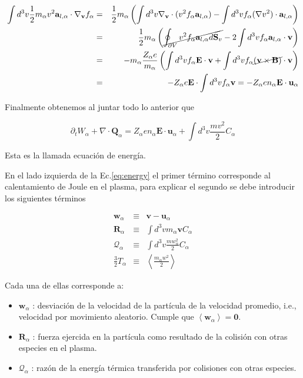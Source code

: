\begin{eqnarray}
  \int d^3v \frac{1}{2}m_\alpha v^2\textbf{a}_{l,\alpha}\cdot \nabla_\textbf{v}f_\alpha&=& \frac{1}{2}m_\alpha \left(\int d^3v \nabla_\textbf{v}\cdot(v^2f_\alpha\textbf{a}_{l,\alpha}) - \int d^3v f_\alpha (\nabla v^2) \cdot \textbf{a}_{l,\alpha}\right)\nonumber\\
  &=& \frac{1}{2}m_\alpha\left(\cancel{\oint_{\partial V}v^2f_\alpha \textbf{a}_{l,\alpha}d\textbf{S}_v} - 2\int d^3v f_\alpha \textbf{a}_{l,\alpha}\cdot\textbf{v}\right) \nonumber\\
  &=& -m_\alpha\frac{Z_\alpha e}{m_\alpha}\left(\int d^3v f_\alpha \textbf{E}\cdot\textbf{v} + \int d^3v f_\alpha \cancel{(\textbf{v}\times\textbf{B})}\cdot\textbf{v}\right)\nonumber\\
  &=& -Z_\alpha e\textbf{E}\cdot\int d^3v f_\alpha \textbf{v} = -Z_\alpha en_\alpha\textbf{E}\cdot\textbf{u}_\alpha 
\end{eqnarray}

Finalmente obtenemos al juntar todo lo anterior que 

\begin{equation}\label{eq:energy}
  \partial_t W_\alpha + \nabla\cdot\textbf{Q}_\alpha = Z_\alpha en_\alpha\textbf{E}\cdot\textbf{u}_\alpha + \int d^3v\frac{mv^2}{2}C_\alpha
\end{equation}

Esta es la llamada ecuaci\'on de energ\'ia.

En el lado izquierda de la Ec.\eqref{eq:energy} el primer t\'ermino corresponde al calentamiento de Joule en el plasma, para explicar el segundo se debe introducir los siguientes t\'erminos

  \begin{eqnarray}
    \textbf{w}_\alpha &\equiv& \textbf{v} - \textbf{u}_\alpha \nonumber\\
    \textbf{R}_\alpha &\equiv& \int d^3v m_\alpha\textbf{v}C_\alpha \nonumber\\
    \mathcal{Q}_\alpha &\equiv& \int d^3v \frac{mw_\alpha^2}{2}C_\alpha \nonumber\\
    \frac{3}{2}T_\alpha &\equiv& \left<\frac{m_\alpha w^2}{2}\right> \label{eq:temp}
  \end{eqnarray}

  Cada una de ellas corresponde a:
  \begin{itemize}
    \item $\textbf{w}_\alpha$ : desviaci\'on de la velocidad de la part\'icula de la velocidad promedio, i.e., velocidad por movimiento aleatorio. Cumple que $\left<\textbf{w}_\alpha\right> = \textbf{0}$.
    \item $\textbf{R}_\alpha$ : fuerza ejercida en la part\'icula como resultado de la colisi\'on con otras especies en el plasma.
    \item $\mathcal{Q}_\alpha$ : raz\'on de la energ\'ia t\'ermica transferida por colisiones con otras especies. 
  \end{itemize}

